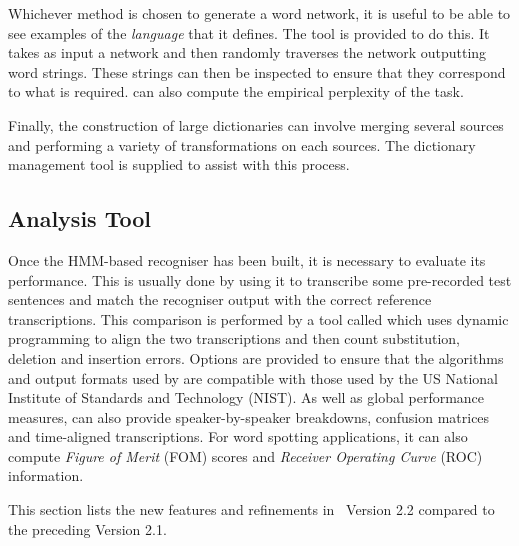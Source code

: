 Whichever method is chosen to generate a word network, it is useful
to be able to see examples of the \textit{language} that it defines.
The tool  is 
provided to do this.  It takes as input
a network and then randomly traverses the network outputting word
strings.  These strings can then be inspected to ensure that they
correspond to what is required.   can also compute
the empirical perplexity of the task.

Finally, the construction of large dictionaries can involve merging
several sources and performing a variety of transformations on each
sources.  The dictionary management 
tool  is supplied
to assist with this process.

\subsection{Analysis Tool}

Once the HMM-based recogniser has been built, it is necessary
to evaluate its performance.  This is usually done by using it
to transcribe some pre-recorded test sentences and match the
recogniser output with the correct reference transcriptions.
This comparison is performed by a tool called 
 which uses dynamic programming to align the two transcriptions
and then count substitution, deletion and insertion errors.
Options are provided to ensure that the
algorithms and output formats used 
by  are compatible
with those used by the US National Institute of Standards and Technology
(NIST).
As well as global performance measures,
 can also provide speaker-by-speaker breakdowns,
confusion matrices and time-aligned transcriptions.  For word spotting
applications, it can also compute \textit{Figure of Merit} (FOM) scores
and \textit{Receiver Operating Curve} (ROC) information.


This  section lists the new features and
refinements in \HTK\ Version 2.2 compared to the preceding Version 2.1.
 

